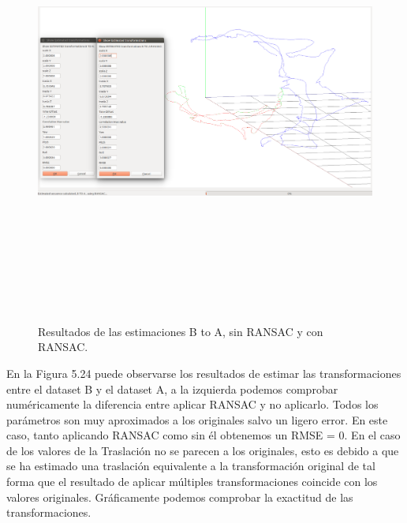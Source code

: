 \begin{figure}[H]
\begin{center}
\label{fig:opciones de View}\includegraphics[height=14.0cm,width=18.0cm]{img/cap6/newData_EscalaTraslaRota_BA.png}
\hspace{0.5cm}

\end{center}

\caption{Resultados de las estimaciones B to A, sin RANSAC y con RANSAC.}
\end{figure}

En la Figura 5.24 puede observarse los resultados de estimar las transformaciones entre el dataset B y el dataset A, a la izquierda podemos comprobar numéricamente la diferencia entre aplicar RANSAC y no aplicarlo. Todos los parámetros son muy aproximados a los originales salvo un ligero error. En este caso, tanto aplicando RANSAC como sin él obtenemos un RMSE =  0. En el caso de los valores de la Traslación no se parecen a los originales, esto es debido a que se ha estimado una traslación equivalente a la transformación original de tal forma que el resultado de aplicar múltiples transformaciones coincide con los valores originales. Gráficamente podemos comprobar la exactitud de las transformaciones.

